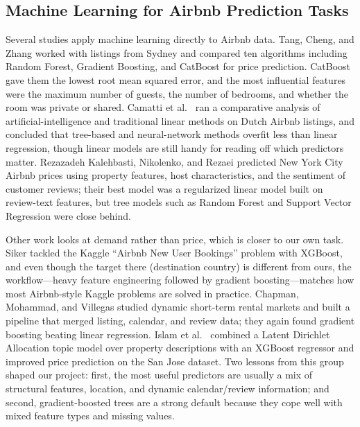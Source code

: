 \documentclass[journal]{IEEEtran}
\begin{document}
\subsection{Machine Learning for Airbnb Prediction Tasks}
Several studies apply machine learning directly to Airbnb data. Tang, Cheng, and
Zhang \cite{tang2024} worked with listings from Sydney and compared ten
algorithms including Random Forest, Gradient Boosting, and CatBoost for price
prediction. CatBoost gave them the lowest root mean squared error, and the most
influential features were the maximum number of guests, the number of bedrooms,
and whether the room was private or shared. Camatti et al.\ \cite{camatti2024}
ran a comparative analysis of artificial-intelligence and traditional linear
methods on Dutch Airbnb listings, and concluded that tree-based and
neural-network methods overfit less than linear regression, though linear models
are still handy for reading off which predictors matter. Rezazadeh Kalehbasti,
Nikolenko, and Rezaei \cite{kalehbasti2019} predicted New York City Airbnb
prices using property features, host characteristics, and the sentiment of
customer reviews; their best model was a regularized linear model built on
review-text features, but tree models such as Random Forest and Support Vector
Regression were close behind.

Other work looks at demand rather than price, which is closer to our own task.
Siker \cite{siker2018} tackled the Kaggle ``Airbnb New User Bookings'' problem
with XGBoost, and even though the target there (destination country) is
different from ours, the workflow---heavy feature engineering followed by
gradient boosting---matches how most Airbnb-style Kaggle problems are solved in
practice. Chapman, Mohammad, and Villegas \cite{chapman2023} studied dynamic
short-term rental markets and built a pipeline that merged listing, calendar,
and review data; they again found gradient boosting beating linear regression.
Islam et al.\ \cite{islam2022} combined a Latent Dirichlet Allocation topic
model over property descriptions with an XGBoost regressor and improved price
prediction on the San Jose dataset. Two lessons from this group shaped our
project: first, the most useful predictors are usually a mix of structural
features, location, and dynamic calendar/review information; and second,
gradient-boosted trees are a strong default because they cope well with mixed
feature types and missing values.
\end{document}
